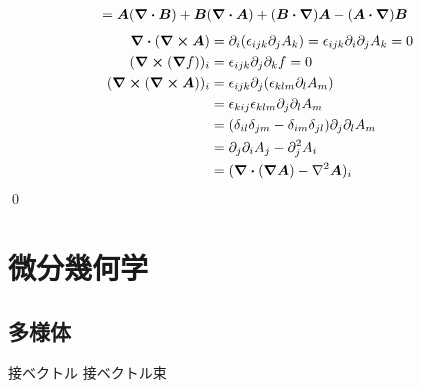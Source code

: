 \documentclass[uplatex,dvipdfmx,a4paper,11pt]{jlreq}
\makeatletter
\newcommand{\rot}{\curl}
\theoremstyle{definition}
\renewenvironment{proof}[1][\proofname]{\par
  \normalfont
  \topsep6\p@\@plus6\p@ \trivlist
  \item[\hskip\labelsep{\bfseries #1}\@addpunct{\bfseries}]\ignorespaces\quad\par
}{%
  \qed\endtrivlist\@endpefalse
}
\renewcommand\proofname{証明}
\makeatother
\begin{document}
\begin{proof}
\begin{align}
                                   & = \bm{A}(\div{\bm{B}}) + \bm{B}(\div{\bm{A}}) + (\bm{B}\vdot\vnabla)\bm{A} - (\bm{A}\vdot\vnabla)\bm{B}
  \end{align}
  \begin{align}
    \div{(\rot{\bm{A}})}     & = \partial_i(\epsilon_{ijk}\partial_jA_k) = \epsilon_{ijk}\partial_i\partial_jA_k = 0 \\
    (\rot{(\grad{f})})_i     & = \epsilon_{ijk}\partial_j\partial_kf = 0                                             \\
    (\rot{(\rot{\bm{A}})})_i & = \epsilon_{ijk}\partial_j(\epsilon_{klm}\partial_lA_m)                               \\
                             & = \epsilon_{kij}\epsilon_{klm}\partial_j\partial_lA_m                                 \\
                             & = (\delta_{il}\delta_{jm} - \delta_{im}\delta_{jl})\partial_j\partial_lA_m            \\
                             & = \partial_j\partial_iA_j - \partial_j^2A_i                                           \\
                             & = (\div{(\grad{\bm{A}})} - \laplacian{\bm{A}})_i
  \end{align}
\end{proof}

\section{微分幾何学}
\subsection{多様体}
接ベクトル
接ベクトル束
\end{document}
